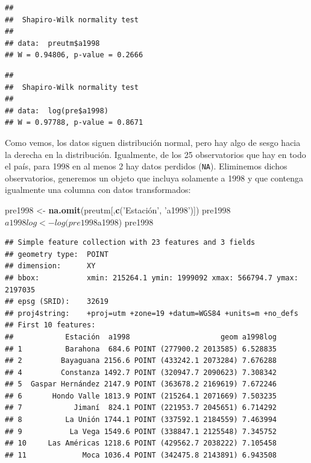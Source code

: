 \documentclass[11pt,]{article}
\newenvironment{Shaded}{\begin{snugshade}}{\end{snugshade}}
\newcommand{\KeywordTok}[1]{\textcolor[rgb]{0.13,0.29,0.53}{\textbf{#1}}}
\newcommand{\StringTok}[1]{\textcolor[rgb]{0.31,0.60,0.02}{#1}}
\newcommand{\OperatorTok}[1]{\textcolor[rgb]{0.81,0.36,0.00}{\textbf{#1}}}
\newcommand{\NormalTok}[1]{#1}
\begin{document}
\begin{Shaded}
\end{Shaded}

\begin{verbatim}
## 
##  Shapiro-Wilk normality test
## 
## data:  preutm$a1998
## W = 0.94806, p-value = 0.2666
\end{verbatim}

\begin{Shaded}
\end{Shaded}

\begin{verbatim}
## 
##  Shapiro-Wilk normality test
## 
## data:  log(pre$a1998)
## W = 0.97788, p-value = 0.8671
\end{verbatim}

Como vemos, los datos siguen distribución normal, pero hay algo de sesgo
hacia la derecha en la distribución. Igualmente, de los 25 observatorios
que hay en todo el país, para 1998 en al menos 2 hay datos perdidos
(\texttt{NA}). Eliminemos dichos observatorios, generemos un objeto que
incluya solamente a 1998 y que contenga igualmente una columna con datos
transformados:

\begin{Shaded}
\begin{Highlighting}[]
\NormalTok{pre1998 <-}\StringTok{ }\KeywordTok{na.omit}\NormalTok{(preutm[,}\KeywordTok{c}\NormalTok{(}\StringTok{'Estación', '}\NormalTok{a1998}\StringTok{')])}
\StringTok{pre1998$a1998log <- log(pre1998$a1998)}
\StringTok{pre1998}
\end{Highlighting}
\end{Shaded}

\begin{verbatim}
## Simple feature collection with 23 features and 3 fields
## geometry type:  POINT
## dimension:      XY
## bbox:           xmin: 215264.1 ymin: 1999092 xmax: 566794.7 ymax: 2197035
## epsg (SRID):    32619
## proj4string:    +proj=utm +zone=19 +datum=WGS84 +units=m +no_defs
## First 10 features:
##            Estación  a1998                     geom a1998log
## 1          Barahona  684.6 POINT (277900.2 2013585) 6.528835
## 2         Bayaguana 2156.6 POINT (433242.1 2073284) 7.676288
## 4         Constanza 1492.7 POINT (320947.7 2090623) 7.308342
## 5  Gaspar Hernández 2147.9 POINT (363678.2 2169619) 7.672246
## 6       Hondo Valle 1813.9 POINT (215264.1 2071669) 7.503235
## 7            Jimaní  824.1 POINT (221953.7 2045651) 6.714292
## 8          La Unión 1744.1 POINT (337592.1 2184559) 7.463994
## 9           La Vega 1549.6 POINT (338847.1 2125548) 7.345752
## 10     Las Américas 1218.6 POINT (429562.7 2038222) 7.105458
## 11             Moca 1036.4 POINT (342475.8 2143891) 6.943508
\end{verbatim}
\end{document}
